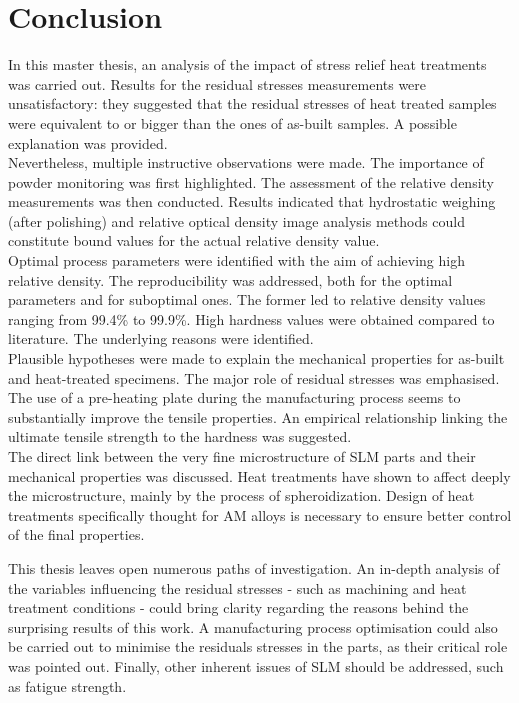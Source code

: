 \chapter{Conclusion}
\label{Chap6}
In this master thesis, an analysis of the impact of stress relief heat treatments was carried out. Results for the residual stresses measurements were unsatisfactory: they suggested that the residual stresses of heat treated samples were equivalent to or bigger than the ones of as-built samples. A possible explanation was provided.\\

Nevertheless, multiple instructive observations were made. The importance of powder monitoring was first highlighted. The assessment of the relative density measurements was then conducted. Results indicated that hydrostatic weighing (after polishing) and relative optical density image analysis methods could constitute bound values for the actual relative density value.\\

Optimal process parameters were identified with the aim of achieving high relative density. The reproducibility was addressed, both for the optimal parameters and for suboptimal ones. The former led to relative density values ranging from 99.4\% to 99.9\%. High hardness values were obtained compared to literature. The underlying reasons were identified.\\

Plausible hypotheses were made to explain the mechanical properties for as-built and heat-treated specimens. The major role of residual stresses was emphasised. The use of a pre-heating plate during the manufacturing process seems to substantially improve the tensile properties. An empirical relationship linking the ultimate tensile strength to the hardness was suggested.\\

The direct link between the very fine microstructure of SLM parts and their mechanical properties was discussed. Heat treatments have shown to affect deeply the microstructure, mainly by the process of spheroidization. Design of heat treatments specifically thought for AM alloys is necessary to ensure better control of the final properties.

This thesis leaves open numerous paths of investigation. An in-depth analysis of the variables influencing the residual stresses - such as machining and heat treatment conditions - could bring clarity regarding the reasons behind the surprising results of this work. A manufacturing process optimisation could also be carried out to minimise the residuals stresses in the parts, as their critical role was pointed out. Finally, other inherent issues of SLM should be addressed, such as fatigue strength.\\


%